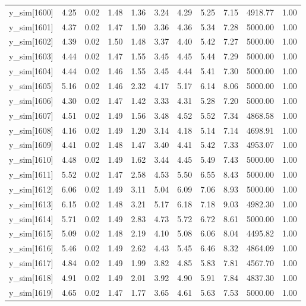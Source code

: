 \begin{table}[ht]
\begin{tabular}{rrrrrrrrrrr}
  y\_sim[1600] & 4.25 & 0.02 & 1.48 & 1.36 & 3.24 & 4.29 & 5.25 & 7.15 & 4918.77 & 1.00 \\ 
  y\_sim[1601] & 4.37 & 0.02 & 1.47 & 1.50 & 3.36 & 4.36 & 5.34 & 7.28 & 5000.00 & 1.00 \\ 
  y\_sim[1602] & 4.39 & 0.02 & 1.50 & 1.48 & 3.37 & 4.40 & 5.42 & 7.27 & 5000.00 & 1.00 \\ 
  y\_sim[1603] & 4.44 & 0.02 & 1.47 & 1.55 & 3.45 & 4.45 & 5.44 & 7.29 & 5000.00 & 1.00 \\ 
  y\_sim[1604] & 4.44 & 0.02 & 1.46 & 1.55 & 3.45 & 4.44 & 5.41 & 7.30 & 5000.00 & 1.00 \\ 
  y\_sim[1605] & 5.16 & 0.02 & 1.46 & 2.32 & 4.17 & 5.17 & 6.14 & 8.06 & 5000.00 & 1.00 \\ 
  y\_sim[1606] & 4.30 & 0.02 & 1.47 & 1.42 & 3.33 & 4.31 & 5.28 & 7.20 & 5000.00 & 1.00 \\ 
  y\_sim[1607] & 4.51 & 0.02 & 1.49 & 1.56 & 3.48 & 4.52 & 5.52 & 7.34 & 4868.58 & 1.00 \\ 
  y\_sim[1608] & 4.16 & 0.02 & 1.49 & 1.20 & 3.14 & 4.18 & 5.14 & 7.14 & 4698.91 & 1.00 \\ 
  y\_sim[1609] & 4.41 & 0.02 & 1.48 & 1.47 & 3.40 & 4.41 & 5.42 & 7.33 & 4953.07 & 1.00 \\ 
  y\_sim[1610] & 4.48 & 0.02 & 1.49 & 1.62 & 3.44 & 4.45 & 5.49 & 7.43 & 5000.00 & 1.00 \\ 
  y\_sim[1611] & 5.52 & 0.02 & 1.47 & 2.58 & 4.53 & 5.50 & 6.55 & 8.43 & 5000.00 & 1.00 \\ 
  y\_sim[1612] & 6.06 & 0.02 & 1.49 & 3.11 & 5.04 & 6.09 & 7.06 & 8.93 & 5000.00 & 1.00 \\ 
  y\_sim[1613] & 6.15 & 0.02 & 1.48 & 3.21 & 5.17 & 6.18 & 7.18 & 9.03 & 4982.30 & 1.00 \\ 
  y\_sim[1614] & 5.71 & 0.02 & 1.49 & 2.83 & 4.73 & 5.72 & 6.72 & 8.61 & 5000.00 & 1.00 \\ 
  y\_sim[1615] & 5.09 & 0.02 & 1.48 & 2.19 & 4.10 & 5.08 & 6.06 & 8.04 & 4495.82 & 1.00 \\ 
  y\_sim[1616] & 5.46 & 0.02 & 1.49 & 2.62 & 4.43 & 5.45 & 6.46 & 8.32 & 4864.09 & 1.00 \\ 
  y\_sim[1617] & 4.84 & 0.02 & 1.49 & 1.99 & 3.82 & 4.85 & 5.83 & 7.81 & 4567.70 & 1.00 \\ 
  y\_sim[1618] & 4.91 & 0.02 & 1.49 & 2.01 & 3.92 & 4.90 & 5.91 & 7.84 & 4837.30 & 1.00 \\ 
  y\_sim[1619] & 4.65 & 0.02 & 1.47 & 1.77 & 3.65 & 4.61 & 5.63 & 7.53 & 5000.00 & 1.00 \\ 

\end{tabular}
\end{table}

